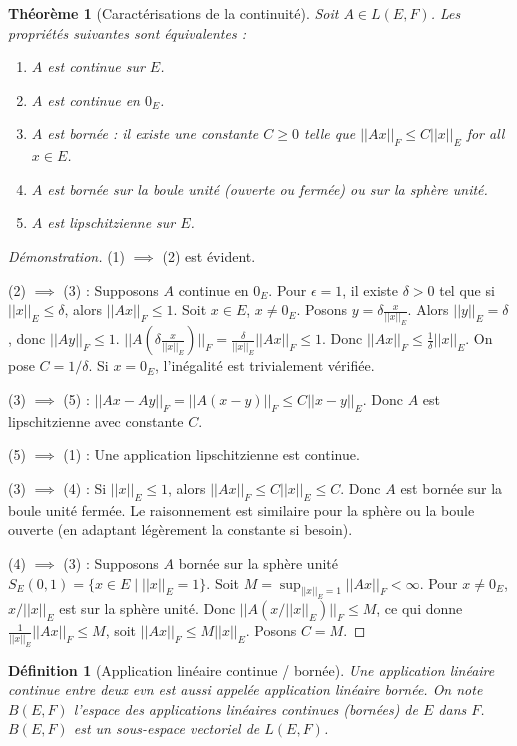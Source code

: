 \documentclass{article}
\newtheorem{theorem}{Théorème}
\newtheorem{definition}{Définition}
\begin{document}
\begin{theorem}[Caractérisations de la continuité]
Soit $A \in L(E, F)$. Les propriétés suivantes sont équivalentes :
\begin{enumerate}
    \item $A$ est continue sur $E$.
    \item $A$ est continue en $0_E$.
    \item $A$ est bornée : il existe une constante $C \ge 0$ telle que $||Ax||_F \le C ||x||_E$ for all $x \in E$.
    \item $A$ est bornée sur la boule unité (ouverte ou fermée) ou sur la sphère unité.
    \item $A$ est lipschitzienne sur $E$.
\end{enumerate}
\end{theorem}

\begin{proof}[Démonstration]
(1) $\implies$ (2) est évident.

(2) $\implies$ (3) : Supposons $A$ continue en $0_E$. Pour $\epsilon = 1$, il existe $\delta > 0$ tel que si $||x||_E \le \delta$, alors $||Ax||_F \le 1$.
Soit $x \in E$, $x \ne 0_E$. Posons $y = \delta \frac{x}{||x||_E}$. Alors $||y||_E = \delta$, donc $||Ay||_F \le 1$.
$||A(\delta \frac{x}{||x||_E})||_F = \frac{\delta}{||x||_E} ||Ax||_F \le 1$.
Donc $||Ax||_F \le \frac{1}{\delta} ||x||_E$. On pose $C = 1/\delta$. Si $x = 0_E$, l'inégalité est trivialement vérifiée.

(3) $\implies$ (5) : $||Ax - Ay||_F = ||A(x-y)||_F \le C ||x-y||_E$. Donc $A$ est lipschitzienne avec constante $C$.

(5) $\implies$ (1) : Une application lipschitzienne est continue.

(3) $\implies$ (4) : Si $||x||_E \le 1$, alors $||Ax||_F \le C ||x||_E \le C$. Donc $A$ est bornée sur la boule unité fermée. Le raisonnement est similaire pour la sphère ou la boule ouverte (en adaptant légèrement la constante si besoin).

(4) $\implies$ (3) : Supposons $A$ bornée sur la sphère unité $S_E(0,1) = \{x \in E \mid ||x||_E = 1\}$. Soit $M = \sup_{||x||_E=1} ||Ax||_F < \infty$. Pour $x \ne 0_E$, $x/||x||_E$ est sur la sphère unité. Donc $||A(x/||x||_E)||_F \le M$, ce qui donne $\frac{1}{||x||_E} ||Ax||_F \le M$, soit $||Ax||_F \le M ||x||_E$. Posons $C=M$.
\end{proof}

\begin{definition}[Application linéaire continue / bornée]
Une application linéaire continue entre deux evn est aussi appelée application linéaire bornée. On note $B(E, F)$ l'espace des applications linéaires continues (bornées) de $E$ dans $F$. $B(E, F)$ est un sous-espace vectoriel de $L(E, F)$.
\end{definition}
\end{document}
